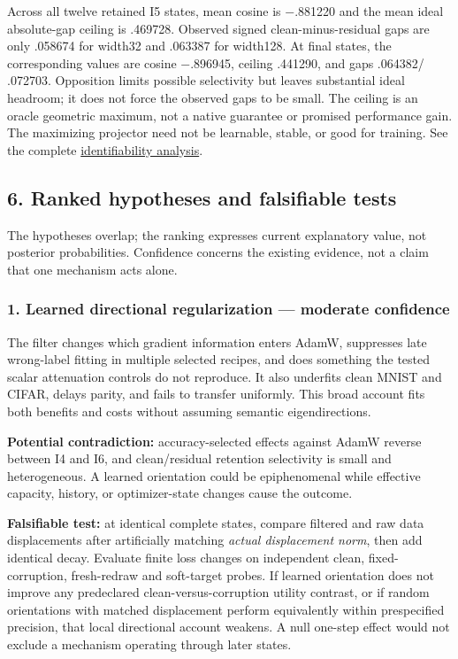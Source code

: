 \documentclass[
  british,
  10pt,
  a4paper,
]{article}
\begin{document}
Across all twelve retained I5 states, mean cosine is −.881220 and the
mean ideal absolute-\allowbreak{}gap ceiling is .469728. Observed signed
clean-\allowbreak{}minus-\allowbreak{}residual gaps are only .058674 for
width32 and .063387 for width128. At final states, the corresponding
values are cosine −.896945, ceiling .441290, and gaps .064382/ .072703.
Opposition limits possible selectivity but leaves substantial ideal
headroom; it does not force the observed gaps to be small. The ceiling
is an oracle geometric maximum, not a native guarantee or promised
performance gain. The maximizing projector need not be learnable,
stable, or good for training. See the complete
\hyperref[label-noise]{identifiability analysis}.

\subsection{6. Ranked hypotheses and falsifiable
tests}\label{synthesis--ranked-hypotheses-and-falsifiable-tests}

The hypotheses overlap; the ranking expresses current explanatory value,
not posterior probabilitie\allowbreak{}s.\allowbreak{} Confidence
concerns the existing evidence, not a claim that one mechanism acts
alone.

\subsubsection{1. Learned directional regularization --- moderate
confidence}\label{synthesis--learned-directional-regularization-moderate-confidence}

The filter changes which gradient information enters AdamW, suppresses
late wrong-\allowbreak{}label fitting in multiple selected recipes, and
does something the tested scalar attenuation controls do not reproduce.
It also underfits clean MNIST and CIFAR, delays parity, and fails to
transfer uniformly. This broad account fits both benefits and costs
without assuming semantic eigendirecti\allowbreak{}ons.\allowbreak{}

\textbf{Potential contradiction:} accuracy-\allowbreak{}selected effects
against AdamW reverse between I4 and I6, and clean/\allowbreak{}residual
retention selectivity is small and
heterogeneou\allowbreak{}s.\allowbreak{} A learned orientation could be
epiphenomenal while effective capacity, history, or
optimizer-\allowbreak{}state changes cause the outcome.

\textbf{Falsifiable test:} at identical complete states, compare
filtered and raw data displacements after artificially matching
\emph{actual displacement norm}, then add identical decay. Evaluate
finite loss changes on independent clean,
fixed-\allowbreak{}corruption,\allowbreak{} fresh-\allowbreak{}redraw
and soft-\allowbreak{}target probes. If learned orientation does not
improve any predeclared
clean-\allowbreak{}versus-\allowbreak{}corruption utility contrast, or
if random orientations with matched displacement perform equivalently
within prespecified precision, that local directional account weakens. A
null one-step effect would not exclude a mechanism operating through
later states.
\end{document}
